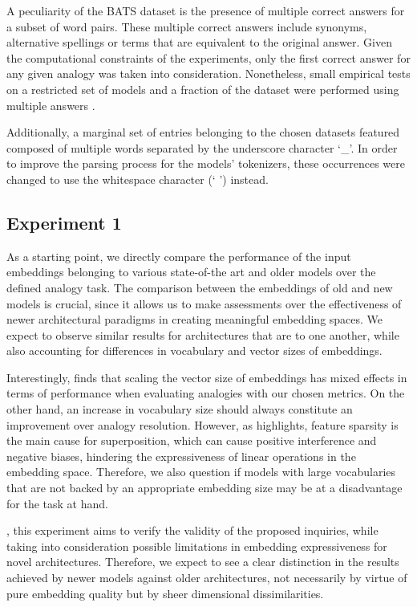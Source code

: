 A peculiarity of the BATS dataset is the presence of multiple correct answers for a subset of word pairs.
These multiple correct answers include synonyms, alternative spellings or terms that are equivalent to the original answer.
Given the computational constraints of the experiments, only the first correct answer for any given analogy was taken into consideration.
Nonetheless, small empirical tests on a restricted set of models and a fraction of the dataset were performed using multiple answers . 

Additionally, a marginal set of entries belonging to the chosen datasets featured  composed of multiple words separated by the underscore character `\_'.
In order to improve the parsing process for the models' tokenizers, these occurrences were changed to use the whitespace character (` ') instead.

\subsection{Experiment 1}\label{ssec:exp_emb_exp1}

As a starting point, we directly compare the performance of the input embeddings belonging to various state-of-the art and older models over the defined analogy task.
The comparison between the embeddings of old and new models is crucial, since it allows us to make assessments over the effectiveness of newer architectural paradigms in creating meaningful embedding spaces.
We expect to observe similar results for architectures that are  to one another, while also accounting for differences in vocabulary and vector sizes of embeddings.

Interestingly, \citet{drozd2016} finds that scaling the vector size of embeddings has mixed effects in terms of performance when evaluating analogies with our chosen metrics.
On the other hand, an increase in vocabulary size should always constitute an improvement over analogy resolution.
However, as \citet{elhage2022} highlights, feature sparsity is the main cause for superposition, which can cause positive interference and negative biases, hindering the expressiveness of linear operations in the embedding space.
Therefore, we also question if models with large vocabularies that are not backed by an appropriate embedding size may be at a disadvantage for the task at hand.

, this experiment aims to verify the validity of the proposed inquiries, while taking into consideration possible limitations in embedding expressiveness for novel architectures.
Therefore, we expect to see a clear distinction in the results achieved by newer models against older architectures, not necessarily by virtue of pure embedding quality but by sheer dimensional dissimilarities.

